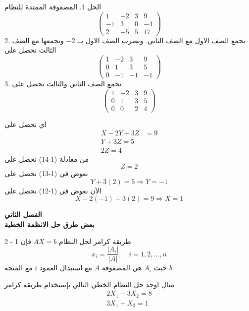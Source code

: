 	\begin{frame}
		\begin{exampleblock}{الحل}
			1. المصفوفة الممتدة للنظام
			\[
			\left(
			\begin{array}{ccc|c}
				1&-2&3&9\\
				-1&3&0&-4\\
				2 &-5& 5& 17
			\end{array}
			\right)
			\]
			2. نجمع الصف الاول مع الصف الثاني. ونضرب الصف الاول بــ $-2$ ونجمعها مع الصف الثالث نحصل على
			\[
			\left(
			\begin{array}{ccc|c}
				1&-2&3&9\\
				0&1&3&5\\
				0 &-1& -1& -1
			\end{array}
			\right)
			\]
			3. نجمع الصف الثاني والثالث نحصل على
			\[
			\left(
			\begin{array}{ccc|c}
				1&-2&3&9\\
				0&1&3&5\\
				0 &0& 2& 4
			\end{array}
			\right)
			\]
		\end{exampleblock}
	\end{frame}
	
	\begin{frame}
		\begin{exampleblock}{}
			
			اي نحصل على
			\begin{align}
				X-2Y+3Z&=9\\
				Y + 3Z=5\\
				2Z=4
			\end{align}
			من معادلة (1-14) نحصل على 
			\[
			Z=2
			\]
			نعوض في (1-13) نحصل على 
			\[
			Y + 3(2) = 5 \Rightarrow Y = -1
			\]
			الآن نعوض في (1-12) نحصل على
			\[
			X - 2(-1) + 3(2) = 9 \Rightarrow X = 1
			\]
		\end{exampleblock}
	\end{frame}
	
	
		\begin{frame}
		\begin{center}
			\Huge
			\textbf{الفصل الثاني}\\
			\textbf{بعض طرق حل الانظمة الخطية}
		\end{center}
	\end{frame}
	
	\begin{frame}
		\begin{exampleblock}{2 - 1 طريقة كرامر}
			لحل النظام $AX=b$ فإن 
			\[
			x_i = \frac{|A_i|}{|A|}, \quad i = 1,2,\dots,n
			\]
			حيث $A_i$ هي المصفوفة $A$ مع استبدال العمود $i$ مع المتجه $b$.
		\end{exampleblock}
		
		\begin{exampleblock}{مثال}
			اوجد حل النظام الخطي التالي بإستخدام طريقة كرامر
			\begin{align*}
				2X_1 - 3X_2 =8\\
				3X_1 + X_2 =1
			\end{align*}
		\end{exampleblock}
	\end{frame}
	
